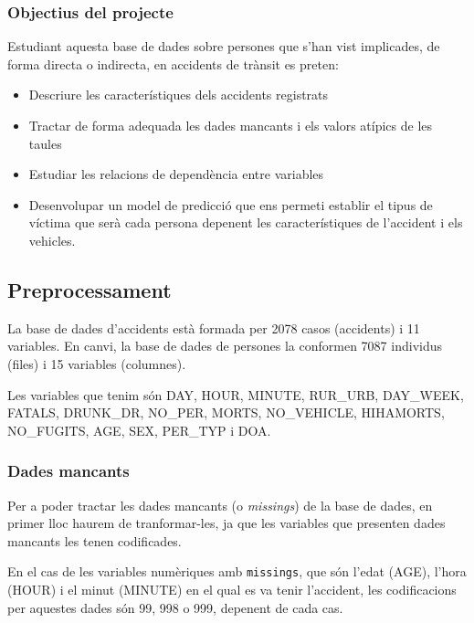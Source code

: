 \documentclass[12pt,longbibliography]{article}
\theoremstyle{definition}
\theoremstyle{remark}
\begin{document}
\subsubsection{Objectius del projecte}

Estudiant aquesta base de dades sobre persones que s'han vist implicades, de forma directa o indirecta, en accidents de trànsit es preten:

\begin{itemize}

\item Descriure les característiques dels accidents registrats

\item Tractar de forma adequada les dades mancants i els valors atípics de les taules

\item Estudiar les relacions de dependència entre variables

\item Desenvolupar un model de predicció que ens permeti establir el tipus de víctima que serà cada persona depenent les característiques de l'accident i els vehicles. 

\end{itemize}


\subsection{Preprocessament}

La base de dades d'accidents està formada per 2078 casos (accidents) i 11 variables. En canvi, la base de dades de persones la conformen 7087 individus (files) i 15 variables (columnes).


Les variables que tenim són DAY, HOUR, MINUTE, RUR\_URB, DAY\_WEEK, FATALS, DRUNK\_DR, NO\_PER, MORTS, NO\_VEHICLE, HIHAMORTS, NO\_FUGITS, AGE, SEX, PER\_TYP i DOA.

\subsubsection{Dades mancants}

Per a poder tractar les dades mancants (o \textit{missings}) de la base de dades, en primer lloc haurem de tranformar-les, ja que les variables que presenten dades mancants les tenen codificades.

En el cas de les variables numèriques amb \texttt{missings}, que són l'edat (AGE), l'hora (HOUR) i el minut (MINUTE) en el qual es va tenir l'accident, les codificacions per aquestes dades són 99, 998 o 999, depenent de cada cas.
\end{document}
